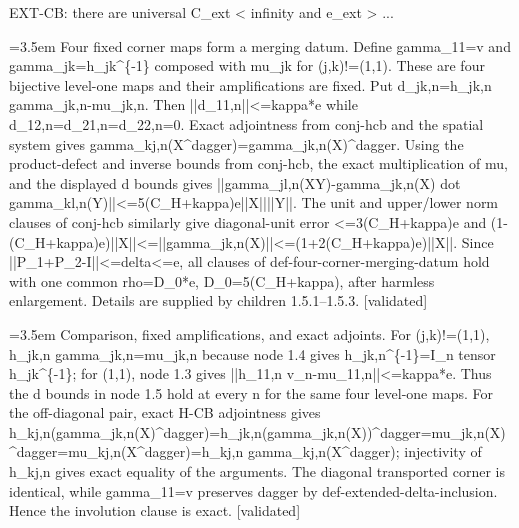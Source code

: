 \documentclass{article}
\newcommand{\step}[1]{\par\noindent\hangindent=3.5em\hangafter=1%
  \makebox[3.5em][l]{\textbf{#1.}}}
\newcommand{\steptag}[1]{\hfill{\small\textsf{[#1]}}}
\begin{document}
\begin{proofbox}{EXT-CB: there are universal C\_ext < infinity and e\_ext > ...}
\step{1.5} Four fixed corner maps form a merging datum. Define gamma\_11=v and gamma\_jk=h\_jk\textasciicircum{}\{-1\} composed with mu\_jk for (j,k)!=(1,1). These are four bijective level-one maps and their amplifications are fixed. Put d\_jk,n=h\_jk,n gamma\_jk,n-mu\_jk,n. Then ||d\_11,n||<=kappa*e while d\_12,n=d\_21,n=d\_22,n=0. Exact adjointness from conj-hcb and the spatial system gives gamma\_kj,n(X\textasciicircum{}dagger)=gamma\_jk,n(X)\textasciicircum{}dagger. Using the product-defect and inverse bounds from conj-hcb, the exact multiplication of mu, and the displayed d bounds gives ||gamma\_jl,n(XY)-gamma\_jk,n(X) dot gamma\_kl,n(Y)||<=5(C\_H+kappa)e||X||||Y||. The unit and upper/lower norm clauses of conj-hcb similarly give diagonal-unit error <=3(C\_H+kappa)e and (1-(C\_H+kappa)e)||X||<=||gamma\_jk,n(X)||<=(1+2(C\_H+kappa)e)||X||. Since ||P\_1+P\_2-I||<=delta<=e, all clauses of def-four-corner-merging-datum hold with one common rho=D\_0*e, D\_0=5(C\_H+kappa), after harmless enlargement. Details are supplied by children 1.5.1--1.5.3. \steptag{validated} \\[6pt]
\step{1.5.1} Comparison, fixed amplifications, and exact adjoints. For (j,k)!=(1,1), h\_jk,n gamma\_jk,n=mu\_jk,n because node 1.4 gives h\_jk,n\textasciicircum{}\{-1\}=I\_n tensor h\_jk\textasciicircum{}\{-1\}; for (1,1), node 1.3 gives ||h\_11,n v\_n-mu\_11,n||<=kappa*e. Thus the d bounds in node 1.5 hold at every n for the same four level-one maps. For the off-diagonal pair, exact H-CB adjointness gives h\_kj,n(gamma\_jk,n(X)\textasciicircum{}dagger)=h\_jk,n(gamma\_jk,n(X))\textasciicircum{}dagger=mu\_jk,n(X)\textasciicircum{}dagger=mu\_kj,n(X\textasciicircum{}dagger)=h\_kj,n gamma\_kj,n(X\textasciicircum{}dagger); injectivity of h\_kj,n gives exact equality of the arguments. The diagonal transported corner is identical, while gamma\_11=v preserves dagger by def-extended-delta-inclusion. Hence the involution clause is exact. \steptag{validated} \\[6pt]

\end{proofbox}
\end{document}
